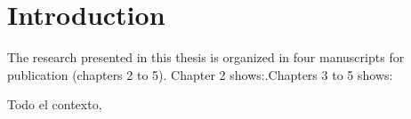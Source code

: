 \chapter{Introduction}
The research presented in this thesis is organized in four manuscripts for publication (chapters 2 to 5). Chapter 2 shows:.Chapters 3 to 5 shows:

Todo el contexto, 